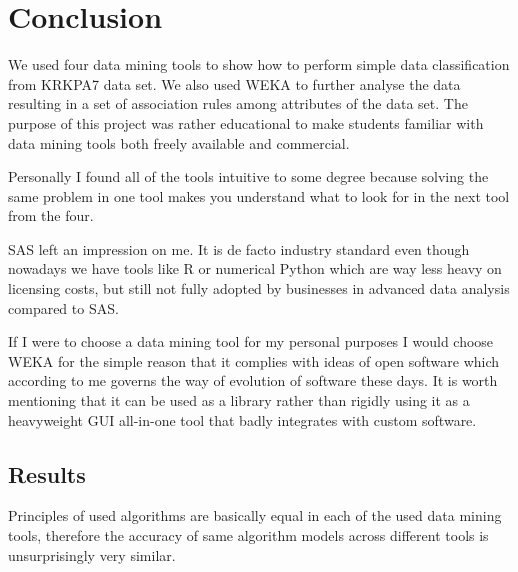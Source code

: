 \documentclass[11pt]{article}
\begin{document}
\clearpage


\section{Conclusion}
We used four data mining tools to show how to perform simple data
classification from KRKPA7 data set. We also used WEKA to further analyse the
data resulting in a set of association rules among attributes of the data set.
The purpose of this project was rather educational to make students familiar
with data mining tools both freely available and commercial.

Personally I found all of the tools intuitive to some degree because solving
the same problem in one tool makes you understand what to look for in the next
tool from the four. 

SAS left an impression on me. It is de facto industry standard even though
nowadays we have tools like R or numerical Python which are way less heavy on
licensing costs, but still not fully adopted by businesses in advanced data
analysis compared to SAS.

If I were to choose a data mining tool for my personal purposes I would choose
WEKA for the simple reason that it complies with ideas of open software which
according to me governs the way of evolution of software these days. It is
worth mentioning that it can be used as a library rather than rigidly using it
as a heavyweight GUI all-in-one tool that badly integrates with custom
software.

\subsection{Results}
Principles of used algorithms are basically equal in each of the used data
mining tools, therefore the accuracy of same algorithm models across different
tools is unsurprisingly very similar.



\end{document}
